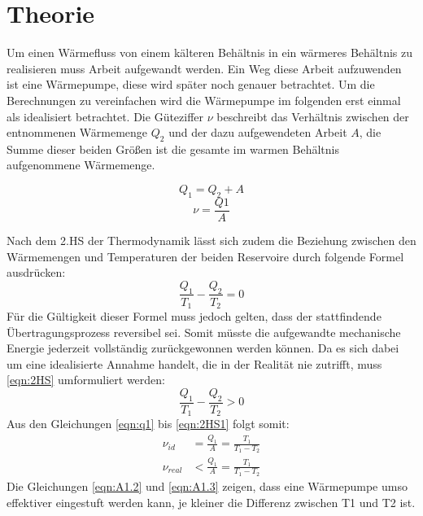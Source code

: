 \section{Theorie}
\label{sec:Theorie}

Um einen Wärmefluss von einem kälteren Behältnis in ein wärmeres Behältnis zu realisieren muss Arbeit aufgewandt werden.
Ein Weg diese Arbeit aufzuwenden ist eine Wärmepumpe, diese wird später noch genauer betrachtet.
Um die Berechnungen zu vereinfachen wird die Wärmepumpe im folgenden erst einmal als idealisiert betrachtet.
Die Güteziffer $\nu$ beschreibt das Verhältnis zwischen der entnommenen Wärmemenge $Q_2$ und der dazu aufgewendeten Arbeit $A$, die Summe dieser beiden Größen ist die gesamte im warmen Behältnis aufgenommene Wärmemenge.


\begin{equation}
  Q_1 = Q_2 + A
  \label{eqn:q1}
\end{equation}
\begin{equation}
  \nu = \frac{Q1}{A}
  \label{eqn:nu}
\end{equation}

\noindent Nach dem 2.HS der Thermodynamik lässt sich zudem die Beziehung zwischen den Wärmemengen und Temperaturen der beiden Reservoire durch folgende Formel ausdrücken:
\begin{equation}
  \frac{Q_1}{T_1} - \frac{Q_2}{T_2} = 0
  \label{eqn:2HS}
\end{equation}
Für die Gültigkeit dieser Formel muss jedoch gelten, dass der stattfindende Übertragungsprozess reversibel sei. Somit müsste die aufgewandte mechanische Energie jederzeit vollständig zurückgewonnen werden können.
Da es sich dabei um eine idealisierte Annahme handelt, die in der Realität nie zutrifft, muss \autoref{eqn:2HS} umformuliert werden:
\begin{equation}
  \frac{Q_1}{T_1} - \frac{Q_2}{T_2} > 0
  \label{eqn:2HS1}
\end{equation}
Aus den Gleichungen \ref{eqn:q1} bis \ref{eqn:2HS1} folgt somit:
\begin{align}
  \nu_{id}   & = \frac{Q_1}{A} = \frac{T_1}{T_1 - T_2} \label{eqn:A1.2} \\
  \nu_{real} & < \frac{Q_1}{A} = \frac{T_1}{T_1 - T_2} \label{eqn:A1.3}
\end{align}
Die Gleichungen \ref{eqn:A1.2} und \ref{eqn:A1.3} zeigen, dass eine Wärmepumpe umso effektiver eingestuft
werden kann, je kleiner die Differenz zwischen T1 und T2
ist.
